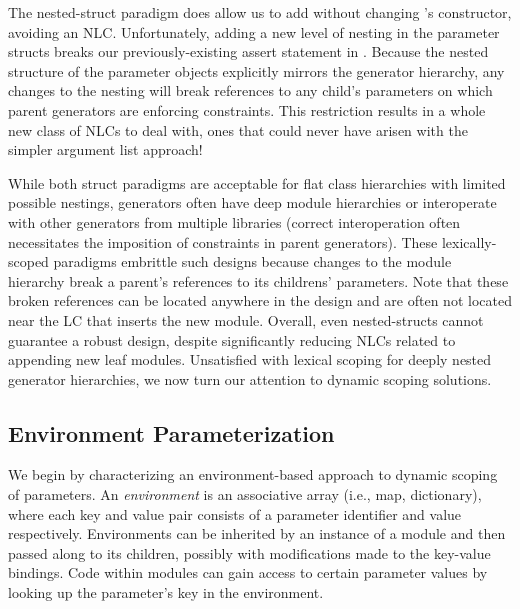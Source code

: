The nested-struct paradigm does allow us to add  without changing 's constructor, avoiding an NLC.
Unfortunately, adding a new level of nesting in the parameter structs breaks our previously-existing assert statement in . 
Because the nested structure of the parameter objects explicitly mirrors the generator hierarchy,
any changes to the nesting will break references to any child's parameters on which parent generators are enforcing constraints.
This restriction results in a whole new class of NLCs to deal with, ones that could never have arisen with the simpler argument list approach!

While both struct paradigms are acceptable for flat class hierarchies with limited possible nestings,
generators often have deep module hierarchies or interoperate with other generators from multiple libraries
(correct interoperation often necessitates the imposition of constraints in parent generators).
These lexically-scoped paradigms embrittle such designs because changes to the module hierarchy break a parent's references to its childrens' parameters. 
Note that these broken references can be located anywhere in the design
and are often not located near the LC that inserts the new module.
Overall, even nested-structs cannot guarantee a robust design, despite significantly reducing NLCs related to appending new leaf modules.
Unsatisfied with lexical scoping for deeply nested generator hierarchies, we now turn our attention to dynamic scoping solutions.

\subsection{Environment Parameterization}
\label{sec:env}

We begin by characterizing an environment-based approach to dynamic scoping of parameters.
An \emph{environment} is an associative array (i.e., map, dictionary), where each key and value pair consists of a parameter identifier and value respectively.
Environments can be inherited by an instance of a module and then passed along to its children, possibly
with modifications made to the key-value bindings.
Code within modules can gain access to certain parameter values by looking up the parameter's key in the environment.

